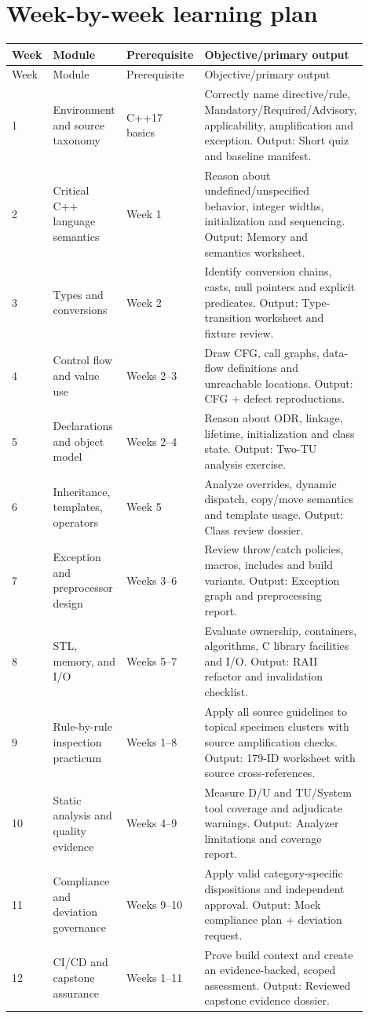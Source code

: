 \documentclass[10pt,letterpaper]{article}
\begin{document}
\section{Week-by-week learning plan}
\small\setlength{\tabcolsep}{3pt}\renewcommand{\arraystretch}{1.15}
\begin{longtable}{p{0.07\linewidth}>{\raggedright\arraybackslash}p{0.23\linewidth}p{0.14\linewidth}>{\raggedright\arraybackslash}p{0.46\linewidth}}
\toprule
Week & Module & Prerequisite & Objective/primary output\\ \midrule
\endfirsthead
\toprule
Week & Module & Prerequisite & Objective/primary output\\ \midrule
\endhead
1 & Environment and source taxonomy & C++17 basics & Correctly name directive/rule, Mandatory/Required/Advisory, applicability, amplification and exception. Output: Short quiz and baseline manifest.\\
2 & Critical C++ language semantics & Week 1 & Reason about undefined/unspecified behavior, integer widths, initialization and sequencing. Output: Memory and semantics worksheet.\\
3 & Types and conversions & Week 2 & Identify conversion chains, casts, null pointers and explicit predicates. Output: Type-transition worksheet and fixture review.\\
4 & Control flow and value use & Weeks 2--3 & Draw CFG, call graphs, data-flow definitions and unreachable locations. Output: CFG + defect reproductions.\\
5 & Declarations and object model & Weeks 2--4 & Reason about ODR, linkage, lifetime, initialization and class state. Output: Two-TU analysis exercise.\\
6 & Inheritance, templates, operators & Week 5 & Analyze overrides, dynamic dispatch, copy/move semantics and template usage. Output: Class review dossier.\\
7 & Exception and preprocessor design & Weeks 3--6 & Review throw/catch policies, macros, includes and build variants. Output: Exception graph and preprocessing report.\\
8 & STL, memory, and I/O & Weeks 5--7 & Evaluate ownership, containers, algorithms, C library facilities and I/O. Output: RAII refactor and invalidation checklist.\\
9 & Rule-by-rule inspection practicum & Weeks 1--8 & Apply all source guidelines to topical specimen clusters with source amplification checks. Output: 179-ID worksheet with source cross-references.\\
10 & Static analysis and quality evidence & Weeks 4--9 & Measure D/U and TU/System tool coverage and adjudicate warnings. Output: Analyzer limitations and coverage report.\\
11 & Compliance and deviation governance & Weeks 9--10 & Apply valid category-specific dispositions and independent approval. Output: Mock compliance plan + deviation request.\\
12 & CI/CD and capstone assurance & Weeks 1--11 & Prove build context and create an evidence-backed, scoped assessment. Output: Reviewed capstone evidence dossier.\\
\bottomrule
\end{longtable}
\normalsize
\end{document}
